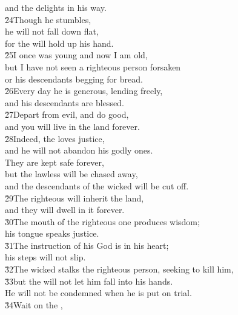 \begin{poetry}
\poemll    and the  delights in his way. \\
\poeml \v{24}Though he stumbles, \\
\poemll    he will not fall down flat, \\
\poemlll       for the  will hold up his hand. \\
\poeml \v{25}I once was young and now I am old, \\
\poemll    but I have not seen a righteous person forsaken \\
\poemlll       or his descendants begging for bread. \\
\poeml \v{26}Every day he is generous, lending freely, \\
\poemll    and his descendants are blessed. \\
\poeml \v{27}Depart from evil, and do good, \\
\poemll    and you will live in the land forever. \\
\poeml \v{28}Indeed, the  loves justice, \\
\poemll    and he will not abandon his godly ones. \\
\poeml They are kept safe forever, \\
\poemll    but the lawless will be chased away, \\
\poemlll       and the descendants of the wicked will be cut off. \\
\poeml \v{29}The righteous will inherit the land, \\
\poemll    and they will dwell in it forever. \\
\poeml \v{30}The mouth of the righteous one produces wisdom; \\
\poemll    his tongue speaks justice. \\
\poeml \v{31}The instruction of his God is in his heart; \\
\poemll    his steps will not slip. \\
\poeml \v{32}The wicked stalks the righteous person, seeking to kill him, \\
\poeml \v{33}but the  will not let him fall into his hands. \\
\poemlll       He will not be condemned when he is put on trial. \\
\poeml \v{34}Wait on the , \\

\end{poetry}
